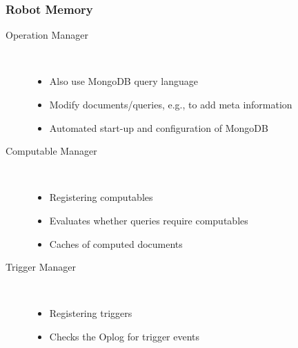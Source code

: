 \begin{frame}
  \frametitle{Robot Memory}
  \begin{description}
  \item[Operation Manager]%
                \hfill \\
    \begin{itemize}
    \item Also use MongoDB query language
    \item Modify documents/queries, e.g., to add meta information %
    \item Automated start-up and configuration of MongoDB %
    \end{itemize}
  \item[Computable Manager]%
                \hfill \\
    \begin{itemize}
    \item Registering computables
    \item Evaluates whether queries require computables
    \item Caches of computed documents
    \end{itemize}
  \item[Trigger Manager]%
                \hfill \\
    \begin{itemize}
    \item Registering triggers
    \item Checks the Oplog for trigger events
    \end{itemize}
  \end{description}
\end{frame}


